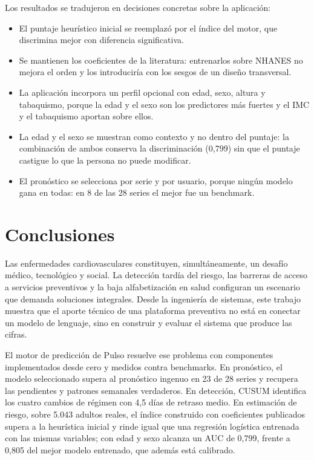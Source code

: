 \documentclass[12pt,letterpaper]{article}
\begin{document}
Los resultados se tradujeron en decisiones concretas sobre la aplicación:

\begin{itemize}
  \item El puntaje heurístico inicial se reemplazó por el índice del motor, que
    discrimina mejor con diferencia significativa.
  \item Se mantienen los coeficientes de la literatura: entrenarlos sobre NHANES
    no mejora el orden y los introduciría con los sesgos de un diseño
    transversal.
  \item La aplicación incorpora un perfil opcional con edad, sexo, altura y
    tabaquismo, porque la edad y el sexo son los predictores más fuertes y el IMC
    y el tabaquismo aportan sobre ellos.
  \item La edad y el sexo se muestran como contexto y no dentro del puntaje: la
    combinación de ambos conserva la discriminación (0,799) sin que el puntaje
    castigue lo que la persona no puede modificar.
  \item El pronóstico se selecciona por serie y por usuario, porque ningún
    modelo gana en todas: en 8 de las 28 series el mejor fue un benchmark.
\end{itemize}

\newpage

\section{Conclusiones}
\label{sec:conclusiones}

Las enfermedades cardiovasculares constituyen, simultáneamente, un desafío
médico, tecnológico y social. La detección tardía del riesgo, las barreras de
acceso a servicios preventivos y la baja alfabetización en salud configuran un
escenario que demanda soluciones integrales. Desde la ingeniería de sistemas,
este trabajo muestra que el aporte técnico de una plataforma preventiva no está
en conectar un modelo de lenguaje, sino en construir y evaluar el sistema que
produce las cifras.

El motor de predicción de Pulso resuelve ese problema con componentes
implementados desde cero y medidos contra benchmarks. En pronóstico, el modelo
seleccionado supera al pronóstico ingenuo en 23 de 28 series y recupera las
pendientes y patrones semanales verdaderos. En detección, CUSUM identifica los
cuatro cambios de régimen con 4,5 días de retraso medio. En estimación de riesgo,
sobre 5.043 adultos reales, el índice construido con coeficientes publicados
supera a la heurística inicial y rinde igual que una regresión logística
entrenada con las mismas variables; con edad y sexo alcanza un AUC de 0,799,
frente a 0,805 del mejor modelo entrenado, que además está calibrado.
\end{document}
